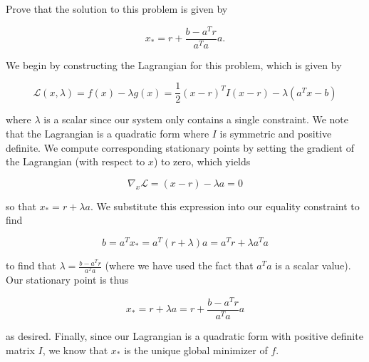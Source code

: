 Prove that the solution to this problem is given by

$$
x_* = r + \frac{b - a^T r}{a^T a} a.
$$

\begin{solution}
    We begin by constructing the Lagrangian for this problem, which is given by

    $$
    \mathcal{L}(x, \lambda) = f(x) - \lambda g(x) = \frac{1}{2} (x - r)^T I (x - r) - \lambda (a^T x - b)
    $$

    where $\lambda$ is a scalar since our system only contains a single constraint. We note that the Lagrangian is a 
    quadratic form where $I$ is symmetric and positive definite. We compute corresponding stationary points by setting 
    the gradient of the Lagrangian (with respect to $x$) to zero, which yields

    $$
    \nabla_x \mathcal{L} = (x - r) - \lambda a = 0
    $$

    so that $x_* = r + \lambda a$. We substitute this expression into our equality constraint to find

    $$
    b = a^T x_* = a^T (r + \lambda) a = a^T r + \lambda a^T a
    $$

    to find that $\lambda = \frac{b - a^T r}{a^T a}$ (where we have used the fact that $a^T a$ is a scalar value). Our 
    stationary point is thus

    $$
    x_* = r + \lambda a = r + \frac{b - a^T r}{a^T a} a
    $$

    as desired. Finally, since our Lagrangian is a quadratic form with positive definite matrix $I$, we know that $x_*$
    is the unique global minimizer of $f$.
    \ \\
\end{solution}